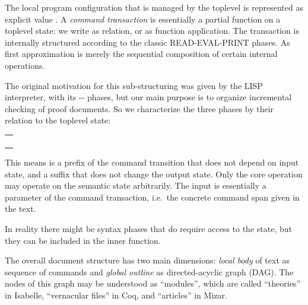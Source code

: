 \begin{isabellebody}
\begin{isamarkuptext}
   The local
  program configuration that is managed by the toplevel is represented
  as explicit value .  A \emph{command transaction} is
  essentially a partial function on a toplevel state: we write  as relation, or  as function
  application.  The transaction is internally structured according to
  the classic READ-EVAL-PRINT phases.  As first approximation  is merely the sequential composition of
  certain internal operations.

  The original motivation for this sub-structuring was given by the
  LISP interpreter, with its -- phases, but our main purpose is to organize incremental
  checking of proof documents.  So we characterize the three phases by
  their relation to the toplevel state:

  \medskip
  \begin{tabular}{l}
  \isa{tr\ st\ {\isacharequal}} \\
  \quad \isa{{\isasymLET}\ x\ {\isacharequal}\ read\ src\ {\isasymIN}} \\
  \quad \isa{{\isasymLET}\ {\isacharparenleft}y{\isacharcomma}\ st{\isacharprime}{\isacharparenright}\ {\isacharequal}\ eval\ x\ st\ {\isasymIN}} \\
  \quad \isa{{\isasymLET}\ {\isacharparenleft}{\isacharparenright}\ {\isacharequal}\ print\ st{\isacharprime}\ y\ {\isasymIN}\ st{\isacharprime}} \\
  \end{tabular}
  \medskip

  This means  is a prefix of the command transition that
  does not depend on input state, and  a suffix that does
  not change the output state.  Only the core  operation
  may operate on the semantic state arbitrarily.  The 
  input is essentially a parameter of the command transaction, i.e.\
  the concrete command span given in the text.

  In reality there might be syntax phases that do require access to
  the state, but they can be included in the inner \isa{eval}
  function.

   The overall document structure has
  two main dimensions: \emph{local body} of text as sequence of
  commands and \emph{global outline} as directed-acyclic graph (DAG).
  The nodes of this graph may be understood as ``modules'', which are
  called ``theories'' in Isabelle, ``vernacular files'' in Coq, and
  ``articles'' in Mizar.


\end{isamarkuptext}
\end{isabellebody}
